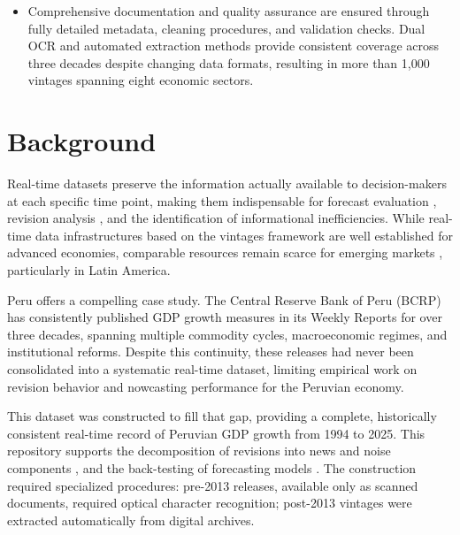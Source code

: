 \documentclass[12pt]{article}
\begin{document}
\begin{itemize}[leftmargin=*]
\item Comprehensive documentation and quality assurance are ensured through fully detailed metadata, cleaning procedures, and validation checks. Dual OCR and automated extraction methods provide consistent coverage across three decades despite changing data formats, resulting in more than 1,000 vintages spanning eight economic sectors.

\end{itemize}

\section*{Background}


Real-time datasets preserve the information actually available to decision-makers at each specific time point, making them indispensable for forecast evaluation \citep{croushore:jel2011}, revision analysis \citep{mankiw:scb1986, aruoba:jmcb2008, strohsal:ijf2020}, and the identification of informational inefficiencies. While real-time data infrastructures based on the vintages framework \citep{croushore:je2001, croushore:hef2006} are well established for advanced economies, comparable resources remain scarce for emerging markets \citep{palis:brazilian2004}, particularly in Latin America.

Peru offers a compelling case study. The Central Reserve Bank of Peru (BCRP) has consistently published  GDP growth measures in its Weekly Reports for over three decades, spanning multiple commodity cycles, macroeconomic regimes, and institutional reforms. Despite this continuity, these releases had never been consolidated into a systematic real-time dataset, limiting empirical work on revision behavior and nowcasting performance for the Peruvian economy.

This dataset was constructed to fill that gap, providing a complete, historically consistent real-time record of Peruvian GDP growth from 1994 to 2025. This repository supports the decomposition of revisions into news and noise components \citep{mankiw:scb1986}, and the back-testing of forecasting models \citep{clark:hef2013}. The construction required specialized procedures: pre-2013 releases, available only as scanned documents, required optical character recognition; post-2013 vintages were extracted automatically from digital archives.
\end{document}
